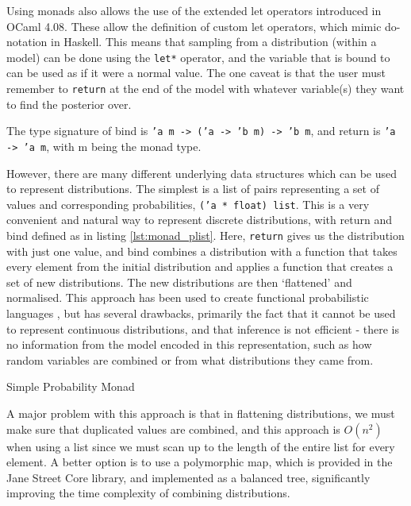Using monads also allows the use of the extended let operators introduced in OCaml 4.08. These allow the definition of custom let operators, which mimic do-notation in Haskell. This means that sampling from a distribution (within a model) can be done using the \texttt{let*} operator, and the variable that is bound to can be used as if it were a normal value. The one caveat is that the user must remember to \texttt{return} at the end of the model with whatever variable(s) they want to find the posterior over.

The type signature of bind is \texttt{'a m -> ('a -> 'b m) -> 'b m}, and return is \texttt{'a -> 'a m}, with m being the monad type.


However, there are many different underlying data structures which can be used to represent distributions. The simplest is a list of pairs representing a set of values and corresponding probabilities, \texttt{('a * float) list}. This is a very convenient and natural way to represent discrete distributions, with return and bind defined as in listing \ref{lst:monad_plist}. Here, \texttt{return} gives us the distribution with just one value, and bind combines a distribution with a function that takes every element from the initial distribution and applies a function that creates a set of new distributions. The new distributions are then `flattened' and normalised. This approach has been used to create functional probabilistic languages \cite{erwig}, but has several drawbacks, primarily the fact that it cannot be used to represent continuous distributions, and that inference is not efficient - there is no information from the model encoded in this representation, such as how random variables are combined or from what distributions they came from.

\begin{listing}[!ht]
	\caption{Simple Probability Monad}
	\label{lst:monad_plist}
\end{listing}

A major problem with this approach is that in flattening distributions, we must make sure that duplicated values are combined, and this approach is $O(n^2)$ when using a list since we must scan up to the length of the entire list for every element. A better option is to use a polymorphic map, which is provided in the Jane Street Core library, and implemented as a balanced tree, significantly improving the time complexity of combining distributions.

